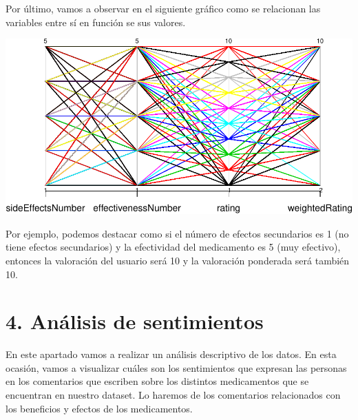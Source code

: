 \documentclass[spanish,]{article}
\newenvironment{Shaded}{\begin{snugshade}}{\end{snugshade}}
\newcommand{\KeywordTok}[1]{\textcolor[rgb]{0.13,0.29,0.53}{\textbf{#1}}}
\newcommand{\DataTypeTok}[1]{\textcolor[rgb]{0.13,0.29,0.53}{#1}}
\newcommand{\DecValTok}[1]{\textcolor[rgb]{0.00,0.00,0.81}{#1}}
\newcommand{\CommentTok}[1]{\textcolor[rgb]{0.56,0.35,0.01}{\textit{#1}}}
\newcommand{\OperatorTok}[1]{\textcolor[rgb]{0.81,0.36,0.00}{\textbf{#1}}}
\newcommand{\NormalTok}[1]{#1}
\begin{document}
Por último, vamos a observar en el siguiente gráfico como se relacionan
las variables entre sí en función se sus valores.

\begin{Shaded}
\end{Shaded}

\includegraphics{practica-original_files/figure-latex/unnamed-chunk-121-1.pdf}

Por ejemplo, podemos destacar como si el número de efectos secundarios
es 1 (no tiene efectos secundarios) y la efectividad del medicamento es
5 (muy efectivo), entonces la valoración del usuario será 10 y la
valoración ponderada será también 10.

\newpage

\section{4. Análisis de sentimientos}\label{analisis-de-sentimientos}

En este apartado vamos a realizar un análisis descriptivo de los datos.
En esta ocasión, vamos a visualizar cuáles son los sentimientos que
expresan las personas en los comentarios que escriben sobre los
distintos medicamentos que se encuentran en nuestro dataset. Lo haremos
de los comentarios relacionados con los beneficios y efectos de los
medicamentos.
\end{document}
